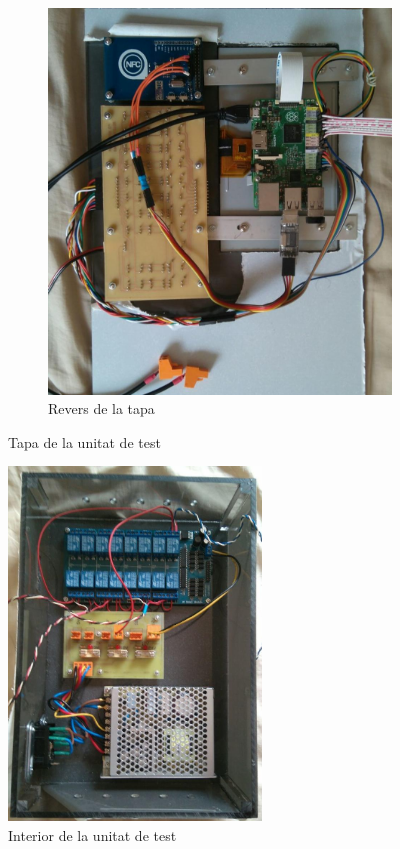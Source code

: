 \begin{figure}[H]
\begin{subfigure}[b]{0.50\textwidth}
		\includegraphics[width=\textwidth]{images/demonstrator_back}
		\caption{Revers de la tapa}
		\label{fig:test-top-back}
	\end{subfigure}
	\caption{Tapa de la unitat de test}
	\label{fig:test-unit-top}
\end{figure}
\vspace{-1em}
\begin{figure}[H]
\center
\includegraphics[width=0.60\textwidth, angle =90]{images/demonstrator_bottom}
\caption{Interior de la unitat de test}
\label{fig:test-unit-bottom}
\end{figure}
